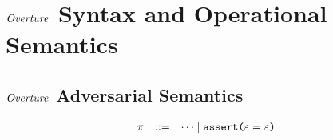 \section{$\mathit{Overture}$ Syntax and Operational Semantics}

\minicatsyntaxfig

\minicatredxfig

\subsection{$\mathit{Overture}$ Adversarial Semantics}

$$
    \begin{array}{rcl@{\hspace{2mm}}r}
      \prog &::=& \cdots \mid \assert{\be = \be}
    \end{array}
$$
    
\minicataredxfig
